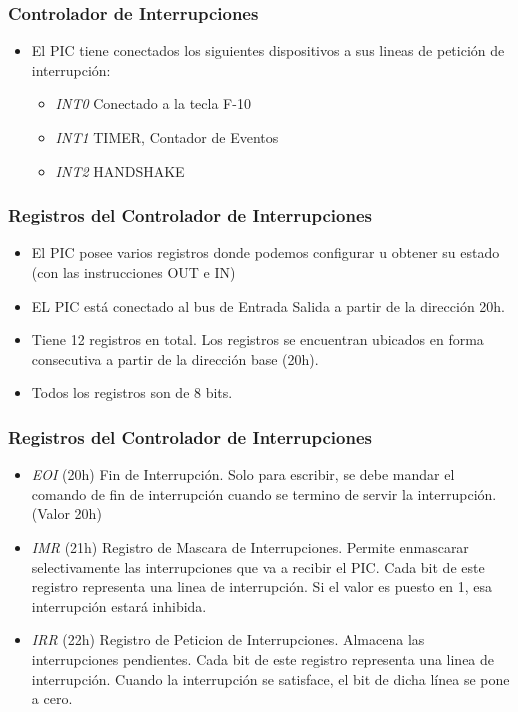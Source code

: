 \documentclass{beamer}
\begin{document}
\begin{frame}
\frametitle{Controlador de Interrupciones}


\begin{itemize}
 \item El PIC tiene conectados los siguientes dispositivos a sus lineas de petición de interrupción:
 \begin{itemize}
  \item \emph{INT0} Conectado a la tecla F-10
  \item \emph{INT1} TIMER, Contador de Eventos
  \item \emph{INT2} HANDSHAKE
 \end{itemize}
\end{itemize}

\end{frame}


\begin{frame}
\frametitle{Registros del Controlador de Interrupciones}


\begin{itemize}
 \item El PIC posee varios registros donde podemos configurar u obtener su estado (con las instrucciones OUT e IN)
 \item EL PIC está conectado al bus de Entrada Salida a partir de la dirección 20h.
 \item Tiene 12 registros en total. Los registros se encuentran ubicados en forma consecutiva a partir de la dirección base (20h).
 \item Todos los registros son de 8 bits.
\end{itemize}
\end{frame}

\begin{frame}
\frametitle{Registros del Controlador de Interrupciones}


\begin{itemize}
 \item \emph{EOI} (20h) Fin de Interrupción. Solo para escribir, se debe mandar el comando de fin de interrupción cuando se termino de servir la interrupción. (Valor 20h)
 \item \emph{IMR} (21h) Registro de Mascara de Interrupciones. Permite enmascarar selectivamente las interrupciones que va a recibir el PIC. Cada bit de este registro representa una linea de interrupción. Si el valor es puesto en 1, esa interrupción estará inhibida.
 \item \emph{IRR} (22h) Registro de Peticion de Interrupciones. Almacena las interrupciones pendientes. Cada bit de este registro representa una linea de interrupción. Cuando la interrupción se satisface, el bit de dicha línea se pone a cero.
\end{itemize}

\end{frame}
\end{document}
